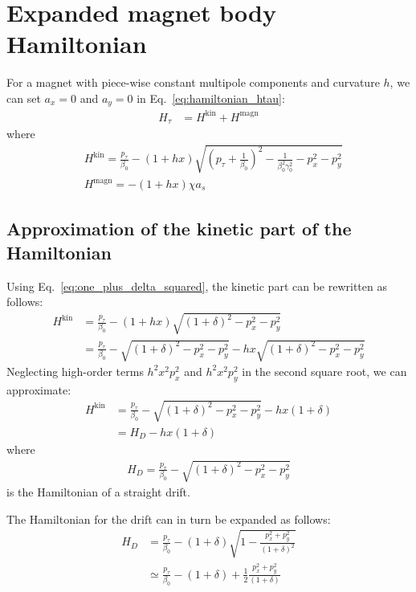 \section{Expanded magnet body Hamiltonian}

For a magnet with piece-wise constant multipole components and curvature $h$, we can
set $a_x = 0$ and $a_y = 0$ in Eq.~\eqref{eq:hamiltonian_htau}:
\begin{align}
 H_\tau   &= H^\text{kin} + H^\text{magn}
\end{align}
where
\begin{align}
  &H^\text{kin} = \frac{p_\tau}{\beta_0} - (1+h x) \sqrt{ \left(p_\tau+\frac{1}{\beta_0}\right)^2
           - \frac{1}{\beta_0^2\gamma_0^2}
           - p_x^2
           - p_y^2} \label{eq:hamilt_kinetic_part}\\
  &H^\text{magn} = -(1+h x) \chi a_s
\end{align}

\subsection{Approximation of the kinetic part of the Hamiltonian}

Using Eq.~\ref{eq:one_plus_delta_squared}, the kinetic part can be rewritten as follows:
\begin{align}
  H^\text{kin}
    &= \frac{p_\tau}{\beta_0} - (1+h x) \sqrt{ (1 + \delta)^2  - p_x^2 - p_y^2}\\
    &= \frac{p_\tau}{\beta_0} - \sqrt{ (1 + \delta)^2 - p_x^2 - p_y^2}
                              - h x \sqrt{ (1 + \delta)^2  - p_x^2 - p_y^2}
\end{align}
Neglecting high-order terms $h^2 x^2 p_x^2$ and $h^2 x^2 p_y^2$ in the second
square root, we can approximate:
\begin{align}
  H^\text{kin}
    &= \frac{p_\tau}{\beta_0} - \sqrt{ (1 + \delta)^2 - p_x^2 - p_y^2} - h x (1 + \delta)\\
    &= H_D - h x (1 + \delta)
    \label{eq:hamilt_kinetic_curv_approx}
\end{align}
where
\begin{align}
  H_D = \frac{p_\tau}{\beta_0} - \sqrt{ (1 + \delta)^2 - p_x^2 - p_y^2}
\end{align}
is the Hamiltonian of a straight drift.

The Hamiltonian for the drift can in turn be expanded as follows:
\begin{align}
  H_D &= \frac{p_\tau}{\beta_0} - (1 + \delta)\sqrt{1  - \frac{p_x^2 + p_y^2}{(1 + \delta)^2}}\\
      &\simeq \frac{p_\tau}{\beta_0} - (1 + \delta) + \frac{1}{2}\frac{p_x^2 + p_y^2}{(1 + \delta)}
      \label{eq:hamilt_drift_expanded}
\end{align}


